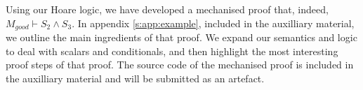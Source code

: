 Using our Hoare logic, we have developed a mechanised proof that, indeed, $M_{good} \vdash S_2 \wedge S_3$.
In appendix \ref{s:app:example}, included in the auxilliary material, we outline the main ingredients of that proof. 
We  expand our  semantics and logic to deal with scalars and conditionals, %
and then highlight the most interesting proof steps of that proof.
The source code of the mechanised proof 
is included in the
  auxilliary material and will be submitted as an artefact.
